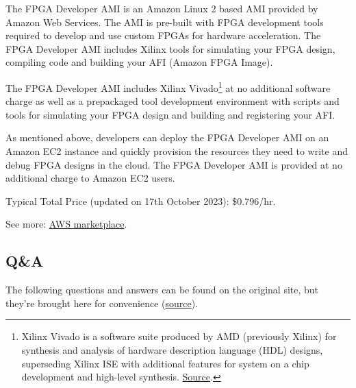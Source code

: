 \documentclass[a4paper]{article}
\begin{document}
    The FPGA Developer AMI is an Amazon Linux 2 based AMI provided by Amazon Web Services. The AMI is pre-built with FPGA development tools required to develop and use custom FPGAs for hardware acceleration. The FPGA Developer AMI includes Xilinx tools for simulating your FPGA design, compiling code and building your AFI (Amazon FPGA Image).\newline

    \noindent
    The FPGA Developer AMI includes Xilinx Vivado\footnote{Xilinx Vivado is a software suite produced by AMD (previously Xilinx) for synthesis and analysis of hardware description language (HDL) designs, superseding Xilinx ISE with additional features for system on a chip development and high-level synthesis. \href{https://en.wikipedia.org/wiki/Vivado}{Source}.} at no additional software charge as well as a prepackaged tool development environment with scripts and tools for simulating your FPGA design and building and registering your AFI.\newline

    \noindent
    As mentioned above, developers can deploy the FPGA Developer AMI on an Amazon EC2 instance and quickly provision the resources they need to write and debug FPGA designs in the cloud. The FPGA Developer AMI is provided at no additional charge to Amazon EC2 users.\newline

    \noindent
    Typical Total Price (updated on 17th October 2023): \$0.796/hr.\newline

    \noindent
    See more: \href{https://aws.amazon.com/marketplace/pp/prodview-iehshpgi7hcjg}{AWS marketplace}.\newpage
    
    \subsection{Q\&A}
    
    The following questions and answers can be found on the original site, but they're brought here for convenience (\href{https://aws.amazon.com/ec2/faqs/?nc1=h_ls#Instance_types}{source}).
\end{document}

